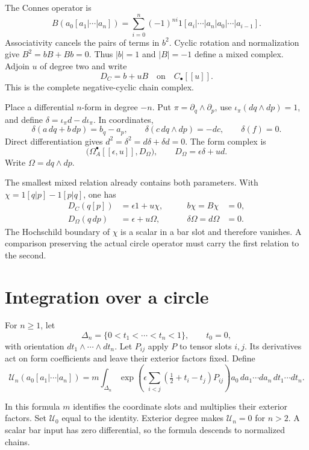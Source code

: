 The Connes operator is
\[
 B(a_0[a_1|\cdots|a_n])
 =\sum_{i=0}^n(-1)^{ni}
      1[a_i|\cdots|a_n|a_0|\cdots|a_{i-1}].
\]
Associativity cancels the pairs of terms in $b^2$.
Cyclic rotation and normalization give $B^2=bB+Bb=0$.
Thus $|b|=1$ and $|B|=-1$ define a mixed complex.
Adjoin $u$ of degree two and write
\[
 D_C=b+uB
 \quad\text{on}\quad C_\bullet[[u]].
\]
This is the complete negative-cyclic chain complex.

Place a differential $n$-form in degree $-n$. Put
$\pi=\partial_q\wedge\partial_p$, use
$\iota_\pi(dq\wedge dp)=1$, and define
$\delta=\iota_\pi d-d\iota_\pi$. In coordinates,
\[
 \delta(a\,dq+b\,dp)=b_q-a_p,\qquad
 \delta(c\,dq\wedge dp)=-dc,\qquad \delta(f)=0.
\]
Direct differentiation gives
$d^2=\delta^2=d\delta+\delta d=0$. The form complex is
\[
 \bigl(\Omega_A^\bullet[[\epsilon,u]],D_\Omega\bigr),
 \qquad D_\Omega=\epsilon\delta+ud.
\]
Write $\Omega=dq\wedge dp$.

The smallest mixed relation already contains both parameters.
With $\chi=1[q|p]-1[p|q]$, one has
\begin{equation}\label{mht:eq:cyclic-vacuum-volume}
 \begin{aligned}
 D_C(q[p])&=\epsilon1+u\chi,\qquad &b\chi=B\chi&=0,\\
 D_\Omega(q\,dp)&=\epsilon+u\Omega, &\delta\Omega=d\Omega&=0.
 \end{aligned}
\end{equation}
The Hochschild boundary of $\chi$ is a scalar in a bar slot
and therefore vanishes. A comparison preserving the actual
circle operator must carry the first relation to the second.

\section{Integration over a circle}

For $n\geq1$, let
\[
 \Delta_n=\{0<t_1<\cdots<t_n<1\},\qquad t_0=0,
\]
with orientation $dt_1\wedge\cdots\wedge dt_n$.
Let $P_{ij}$ apply $P$ to tensor slots $i,j$.
Its derivatives act on form coefficients and leave their
exterior factors fixed. Define
\begin{equation}\label{mht:eq:circle-comparison}
 \mathcal U_n(a_0[a_1|\cdots|a_n])
 =m\int_{\Delta_n}
   \exp\!\left(\epsilon\sum_{i<j}
                 (\tfrac12+t_i-t_j)P_{ij}\right)
       a_0\,da_1\cdots da_n\,dt_1\cdots dt_n.
\end{equation}

In this formula $m$ identifies the coordinate slots and
multiplies their exterior factors. Set $\mathcal U_0$ equal
to the identity. Exterior degree makes $\mathcal U_n=0$ for
$n>2$. A scalar bar input has zero differential, so the formula
descends to normalized chains.

